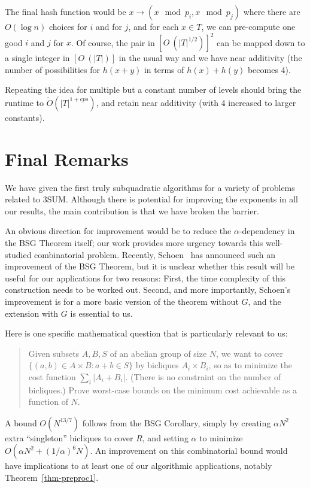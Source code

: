 \documentclass[11pt]{article}
\begin{document}
{{The final hash function would be $x \rightarrow (x \mod p_i, x \mod p_j)$
where there are $O(\log n)$ choices for $i$ and for $j$, and for each $x \in T$,
we can pre-compute one good $i$ and $j$ for $x$.  Of course, the pair
in $[O~(|T|^{1/2})]^2$ can be mapped down to a single integer in $[O~(|T|)]$
in the usual way and we have near additivity (the number of possibilities
for $h(x+y)$ in terms of $h(x)+h(y)$ becomes 4).

Repeating the idea for multiple but a constant number of levels should
bring the runtime to $\tilde{O}(|T|^{1+eps})$, and retain near additivity (with
4 increased to larger constants).

}


\section{Final Remarks}

We have given the first truly subquadratic algorithms for
a variety of problems related to 3SUM\@.
Although there is potential for improving the exponents in
all our results, the main contribution is that we have broken the
barrier.

An obvious direction for improvement would be to reduce the
$\alpha$-dependency in the BSG Theorem itself;
our work provides more urgency towards this well-studied combinatorial
problem.  Recently, Schoen~\cite{Sch14} has announced such an improvement of
the BSG Theorem, but it is unclear whether this result will be useful
for our applications for two reasons: First, the time complexity of
this construction needs to be worked out. Second, and more importantly,
Schoen's improvement is for a more basic version of the theorem without $G$,
and the extension with $G$ is essential to us.

Here is one specific mathematical question that is particularly relevant to us:
\begin{quote}
Given subsets $A,B,S$ of
an abelian group of size $N$, we want to
cover $\{(a,b)\in A\times B: a+b\in S\}$
by bicliques $A_i\times B_i$, so as to minimize the cost function
$\sum_i |A_i+B_i|$.  (There is no constraint on the
number of bicliques.)  Prove worst-case bounds on the minimum
cost achievable as a function of $N$.
\end{quote}
A bound $O(N^{13/7})$ follows from the BSG Corollary, simply by
creating $\alpha N^2$ extra ``singleton'' bicliques
to cover $R$, and setting $\alpha$ to minimize
$O(\alpha N^2 + (1/\alpha)^6 N)$.  An improvement on this
combinatorial bound would have implications to at
least one of our algorithmic applications, notably
Theorem~\ref{thm-preproc1}.

}
\end{document}

